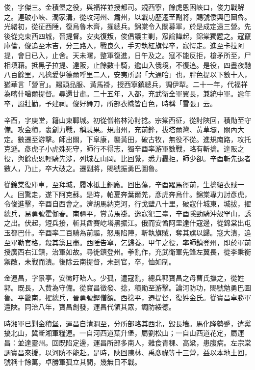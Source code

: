 \begin{pinyinscope}
俊，字傑三。金積堡之役，與福祥並授都司。規西寧，餘虎恩困峽口，俊力戰解之。連破小峽、潤家溝，從攻河州、肅州，以戰功歷遷至副將，賜號倭興巴圖魯。光緒初，從征西陲，復烏魯木齊，擢總兵。錦棠令入關募軍，於是成定遠三營。先後從克東西四城，晉提督。安夷復叛，俊倡議主剿，眾論譁起，錦棠獨韙之。寇竄庫倫，俊追至木吉，分三路入，戰良久，手刃執紅旗悍卒，寇愕走。進至卡拉阿提，會日已入，止舍。天未曙，整軍復進，日午及之。寇不能反拒，槍矛所至，尸相填藉。抵黑子拉提、達阪，止餘數十騎，逾山入俄境，不復追。是役，四晝夜馳八百餘里，凡擒愛伊德爾呼里二人，安夷所謂「大通哈」也，胖色提以下數十人，猶華言「營官」。賜頭品服、黃馬褂，授西寧鎮總兵，調伊犁。二十一年，代福祥為喀什噶爾提督。尋還甘肅。二十五年，入都，充武衛全軍翼長，兼統中軍。逾年卒，謚壯勤，予建祠。俊好舞刀，所部衣幟皆白色，時稱「雪張」云。

辛酉，字庚堂，籍山東鄆城。初從僧格林沁討捻。宗棠西征，從討陜回，積勛至守備。攻金積，裹創力戰，稱驍果。規肅州，充前鋒，拔塔爾灣、黃草壩，關內大定。數遷至游擊。師出關，下阜康，襲黃田，破古牧，無役不從。進規南路，攻托克遜。彥虎子小虎殊死守，師行不得志，獨辛酉率游軍數戰，略有斬擒。達阪之役，與餘虎恩輕騎先涉，列城左山岡。比回覺，悉力轟拒，師少卻。辛酉斬先退者數人，乃止，卒大破之。遷副將，賜號振勇巴圖魯。

從錦棠復庫車，至拜城，履冰抵上銅廠。回出蕩，辛酉躍馬徑前，生擒貂衣賊一人。回驚走，遂下阿克蘇。是時，帕夏奔葉爾羌，彥虎奔烏什。錦棠專力討彥虎，令俊進擊，辛酉自西會之。濟胡馬納克河，行戈壁八十里，破寇什城東，城拔，擢總兵，易勇號霍伽春。南疆平，賞黃馬褂。逸寇犯三臺，辛酉隱勁騎沖殼罕山，誘之出。伏起，短兵接，斬其酋賽屹塔黑振江。俄而安酋阿里達什寇邊，從錦棠出屯玉都巴什。辛酉率二百騎為前驅，怒馬陷陣，斬執旗賊，奪其旗以歸。寇大潰，追至畢勒套格，殺其黨且盡。西陲告寧，乞歸養。甲午之役，率師鎮登州，即於軍前授廣西右江鎮，治軍如故。尋徙鎮登州。拳亂作，充武衛軍先鋒左翼長，從李秉衡禦敵，未戰而潰。後除云南提督，未到官，卒，恤如制。

金運昌，字景亭，安徽盱眙人。少孤，遭寇亂，總兵郭寶昌之母曹氏撫之，從姓郭。既長，入貲為守備。從寶昌徵發、捻，積勛至游擊。論河防功，賜號勉勇巴圖魯。平畿南，擢總兵，晉勇號鏗僧額。西捻平，遷提督，復姓金氏。從寶昌卓勝軍還陜。同治八年，寶昌創發，運昌代領其眾，調防綏德。

時湘軍已剿金積堡，運昌自清澗至，分所部略其西北，毀長墻。馬化隆勢蹙，遣黨擾北山，冀斷湘軍糧運。一自河西道葉升堡，屬劉松山；一自山西道花定，屬運昌：並達靈州。回既陷定邊，運昌所部多南人，雜食青稞、高粱，患腹病。左宗棠調寶昌來援，以河防不能赴。是時，陜回陳林、禹彥祿等十三營，益以本地土回，號稱十餘萬，卓勝軍孤立其間，幾無日不戰。


\end{pinyinscope}
